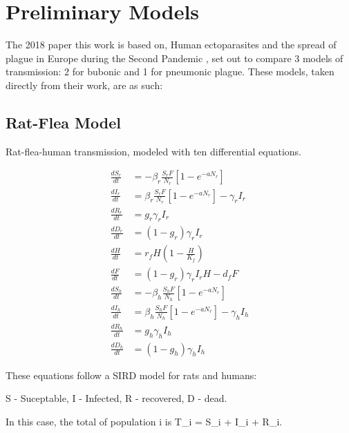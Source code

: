 \documentclass [letterpaper, 12pt] {article}
\begin{document}
%


\pagebreak

\section {Preliminary Models}
The 2018 paper this work is based on, Human ectoparasites and the spread of plague in
Europe during the Second Pandemic \cite{Dean1304}, set out to compare 3 models of
transmission: 2 for bubonic and 1 for pneumonic plague. These models, taken directly from their work, are as such:

\subsection {Rat-Flea Model}
Rat-flea-human transmission, modeled with ten differential equations.

\begin{equation}
	\begin{align*}
		\frac{dS_r}{dt} &= - \beta_r \frac{S_r F}{N_r} \left[ 1 - e^{-aN_r} \right] \\
		\frac{dI_r}{dt} &= \beta_r \frac{S_r F}{N_r} \left[ 1 - e^{-aN_r} \right] - \gamma_r I_r \\
		\frac{dR_r}{dt} &= g_r \gamma_r I_r \\
		\frac{dD_r}{dt} &= (1 - g_r) \gamma_r I_r \\
		\frac{dH}{dt} &= r_f H \left( 1 - \frac{H}{K_f} \right) \\
		\frac{dF}{dt} &= (1 - g_r) \gamma_r I_r H - d_f F \\
		\frac{dS_h}{dt} &= - \beta_h \frac{S_h F}{N_h} \left[ 1 - e^{-aN_r} \right] \\
		\frac{dI_h}{dt} &= \beta_h \frac{S_h F}{N_h} \left[ 1 - e^{-aN_r} \right] - \gamma_h I_h \\
		\frac{dR_h}{dt} &= g_h \gamma_h I_h \\
		\frac{dD_h}{dt} &= (1 - g_h) \gamma_h I_h
	\end{align*}
\end{equation}

These equations follow a SIRD model for rats and humans:

S - Suceptable,
I - Infected,
R - recovered,
D - dead.

In this case, the total of population i is T_i = S_i + I_i + R_i.
\end{document}
